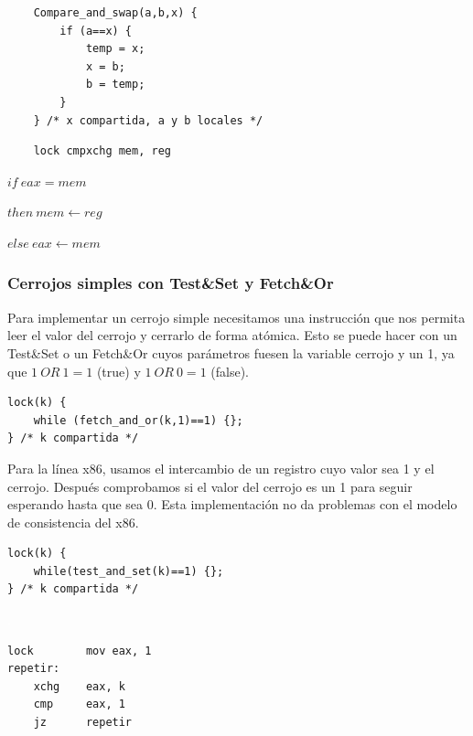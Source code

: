 \documentclass[10pt,a4paper,spanish]{report}
\begin{document}
\begin{enumerate}[\color{azul}{\bf $\heartsuit$}]
    \begin{minipage}{0.5\textwidth}
    \begin{verbatim}
    Compare_and_swap(a,b,x) {
        if (a==x) {
            temp = x;
            x = b;
            b = temp;
        }
    } /* x compartida, a y b locales */
    \end{verbatim}
    \end{minipage}
    \begin{minipage}{0.5\textwidth}
    \begin{verbatim}
    lock cmpxchg mem, reg
    \end{verbatim}

    $ if~eax = mem $

    $then~mem \longleftarrow reg$

    $else~eax \longleftarrow mem $
    \end{minipage}

\end{enumerate}

\textcolor{azul}{\subsubsection{Cerrojos simples con Test\&Set y Fetch\&Or}}
Para implementar un cerrojo simple necesitamos una instrucción que nos permita leer el valor del cerrojo y cerrarlo de forma atómica. Esto se puede hacer con un Test\&Set o un Fetch\&Or cuyos parámetros fuesen la variable cerrojo y un 1, ya que $1~OR~1=1$ (true) y $1~OR~0=1$ (false).

\begin{verbatim}
lock(k) {
    while (fetch_and_or(k,1)==1) {};
} /* k compartida */
\end{verbatim}


Para la línea x86, usamos el intercambio de un registro cuyo valor sea 1 y el cerrojo. Después comprobamos si el valor del cerrojo es un 1 para seguir esperando hasta que sea 0. Esta implementación no da problemas con el modelo de consistencia del x86.

\begin{minipage}{0.5\textwidth}
\begin{verbatim}
lock(k) {
    while(test_and_set(k)==1) {};
} /* k compartida */
\end{verbatim}
\end{minipage}
\begin{minipage}{0.2\textwidth}
\textcolor{White}{.}
\end{minipage}
\begin{minipage}{0.3\textwidth}
\begin{verbatim}
lock        mov eax, 1
repetir:
    xchg    eax, k
    cmp     eax, 1
    jz      repetir
\end{verbatim}
\end{minipage}
\end{document}
